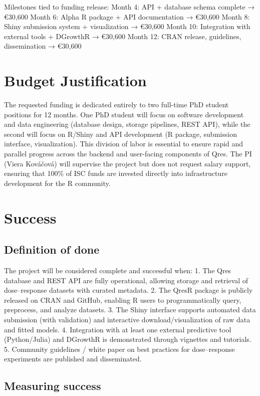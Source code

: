 \documentclass[
]{article}
\begin{document}
Milestones tied to funding release: Month 4: API + database schema
complete → €30,600 Month 6: Alpha R package + API documentation →
€30,600 Month 8: Shiny submission system + visualization → €30,600 Month
10: Integration with external tools + DGrowthR → €30,600 Month 12: CRAN
release, guidelines, dissemination → €30,600

\section{Budget Justification}\label{budget-justification}

The requested funding is dedicated entirely to two full-time PhD student
positions for 12 months. One PhD student will focus on software
development and data engineering (database design, storage pipelines,
REST API), while the second will focus on R/Shiny and API development (R
package, submission interface, visualization). This division of labor is
essential to ensure rapid and parallel progress across the backend and
user-facing components of Qres. The PI (Viera Kováčová) will supervise
the project but does not request salary support, ensuring that 100\% of
ISC funds are invested directly into infrastructure development for the
R community.

\section{Success}\label{success}

\subsection{Definition of done}\label{definition-of-done}

The project will be considered complete and successful when: 1. The Qres
database and REST API are fully operational, allowing storage and
retrieval of dose--response datasets with curated metadata. 2. The QresR
package is publicly released on CRAN and GitHub, enabling R users to
programmatically query, preprocess, and analyze datasets. 3. The Shiny
interface supports automated data submission (with validation) and
interactive download/visualization of raw data and fitted models. 4.
Integration with at least one external predictive tool (Python/Julia)
and DGrowthR is demonstrated through vignettes and tutorials. 5.
Community guidelines / white paper on best practices for dose--response
experiments are published and disseminated.

\subsection{Measuring success}\label{measuring-success}
\end{document}
